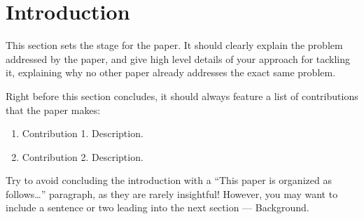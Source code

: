 \section{Introduction}
\label{sec:introduction}

This section sets the stage for the paper. 
It should clearly explain the problem addressed by the 
paper, and give high level details of your approach
for tackling it, explaining why no other paper already
addresses the exact same problem.

Right before this section concludes, it should always
feature a list of contributions that the paper makes:

\begin{enumerate}

    \item Contribution 1. Description.

    \item Contribution 2. Description.

\end{enumerate}    

Try to avoid concluding the introduction with a 
``This paper is organized as follows\ldots'' paragraph,
as they are rarely insightful! 
%
However, you may want to include a sentence or two 
leading into the next section --- Background.
